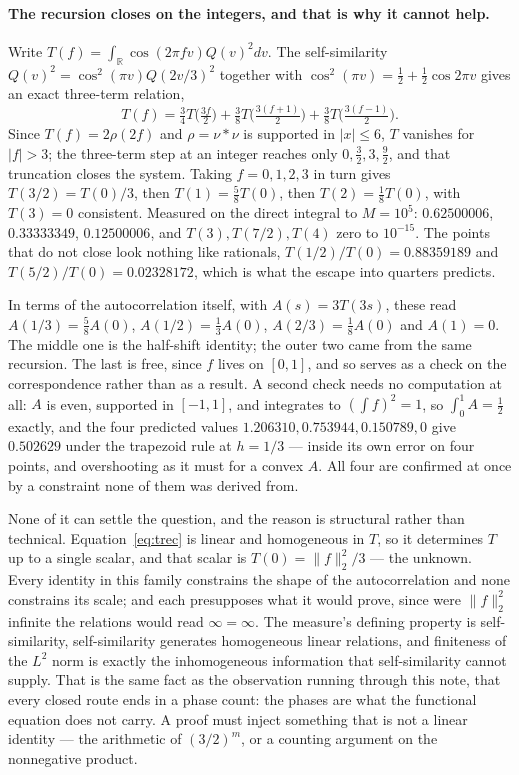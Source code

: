\documentclass[11pt]{article}
\theoremstyle{remark}
\begin{document}
\paragraph{The recursion closes on the integers, and that is why it cannot help.} Write
$T(f)=\int_{\mathbb R}\cos(2\pi fv)Q(v)^2dv$. The self-similarity $Q(v)^2=\cos^2(\pi v)Q(2v/3)^2$ together
with $\cos^2(\pi v)=\tfrac12+\tfrac12\cos2\pi v$ gives an exact three-term relation,
\begin{equation}\label{eq:trec}
  T(f)=\tfrac34T\bigl(\tfrac{3f}{2}\bigr)+\tfrac38T\bigl(\tfrac{3(f+1)}{2}\bigr)
       +\tfrac38T\bigl(\tfrac{3(f-1)}{2}\bigr).
\end{equation}
Since $T(f)=2\rho(2f)$ and $\rho=\nu*\nu$ is supported in $|x|\le6$, $T$ vanishes for $|f|>3$; the
three-term step at an integer reaches only $0,\tfrac32,3,\tfrac92$, and that truncation closes the
system. Taking $f=0,1,2,3$ in turn gives $T(3/2)=T(0)/3$, then $T(1)=\tfrac58T(0)$, then
$T(2)=\tfrac18T(0)$, with $T(3)=0$ consistent. Measured on the direct integral to $M=10^5$:
$0.62500006$, $0.33333349$, $0.12500006$, and $T(3),T(7/2),T(4)$ zero to $10^{-15}$. The points that do
not close look nothing like rationals, $T(1/2)/T(0)=0.88359189$ and $T(5/2)/T(0)=0.02328172$, which is
what the escape into quarters predicts.

In terms of the autocorrelation itself, with $A(s)=3T(3s)$, these read
$A(1/3)=\tfrac58A(0)$, $A(1/2)=\tfrac13A(0)$, $A(2/3)=\tfrac18A(0)$ and $A(1)=0$. The middle one is the
half-shift identity; the outer two came from the same recursion. The last is free, since $f$ lives on
$[0,1]$, and so serves as a check on the correspondence rather than as a result. A second check needs no
computation at all: $A$ is even, supported in $[-1,1]$, and integrates to $(\int f)^2=1$, so
$\int_0^1A=\tfrac12$ exactly, and the four predicted values $1.206310,0.753944,0.150789,0$ give
$0.502629$ under the trapezoid rule at $h=1/3$ --- inside its own error on four points, and overshooting
as it must for a convex $A$. All four are confirmed at once by a constraint none of them was derived
from.

None of it can settle the question, and the reason is structural rather than technical.
Equation~\eqref{eq:trec} is linear and homogeneous in $T$, so it determines $T$ up to a single scalar,
and that scalar is $T(0)=\|f\|_2^2/3$ --- the unknown. Every identity in this family constrains the shape
of the autocorrelation and none constrains its scale; and each presupposes what it would prove, since
were $\|f\|_2^2$ infinite the relations would read $\infty=\infty$. The measure's defining property is
self-similarity, self-similarity generates homogeneous linear relations, and finiteness of the $L^2$ norm
is exactly the inhomogeneous information that self-similarity cannot supply. That is the same fact as
the observation running through this note, that every closed route ends in a phase count: the phases are
what the functional equation does not carry. A proof must inject something that is not a linear
identity --- the arithmetic of $(3/2)^m$, or a counting argument on the nonnegative product.
\end{document}
